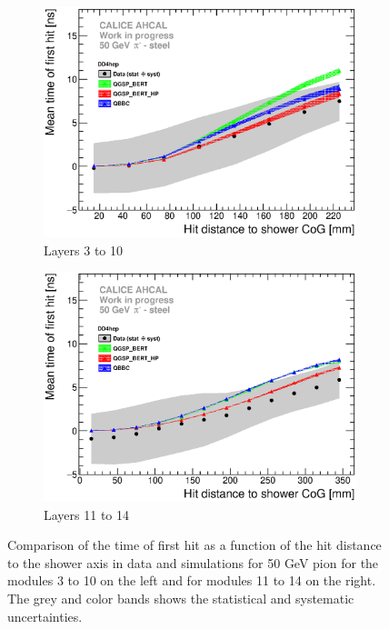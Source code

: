 \documentclass{JINST}
\begin{document}
\begin{figure}[htbp!]
  \begin{subfigure}[t]{0.49\textwidth}
    \centering
    \includegraphics[width=1\textwidth]{fig/Time_Radius_50GeV_SSF_DD4hep.eps}
    \caption{Layers 3 to 10} \label{fig:Radius_SSF_SimData_50GeV}
  \end{subfigure}
  \hfill
  \begin{subfigure}[t]{0.49\textwidth}
    \centering
    \includegraphics[width=1\textwidth]{fig/Time_Radius_50GeV_BL_DD4hep.eps}
    \caption{Layers 11 to 14} \label{fig:Radius_BL_SimData_50GeV}
  \end{subfigure}
  \caption{Comparison of the time of first hit as a function of the hit distance to the shower axis in data and simulations for 50 GeV pion for the modules 3 to 10 on the left and for modules 11 to 14 on the right. The grey and color bands shows the statistical and systematic uncertainties.}
  \label{fig:Radius_SSF_SimData_50GeVComparison}
\end{figure}
\end{document}
